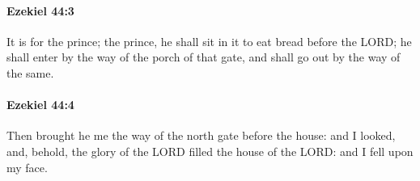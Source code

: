		\paragraph{Ezekiel 44:3} %
			\label{EZEKIEL-44-3}

			It is for the prince; the prince, he shall sit in it to eat bread before the LORD; he shall enter by the way of the porch of that gate, and shall go out by the way of the same.


		\paragraph{Ezekiel 44:4} %
			\label{EZEKIEL-44-4}

			Then brought he me the way of the north gate before the house: and I looked, and, behold, the glory of the LORD filled the house of the LORD: and I fell upon my face.


